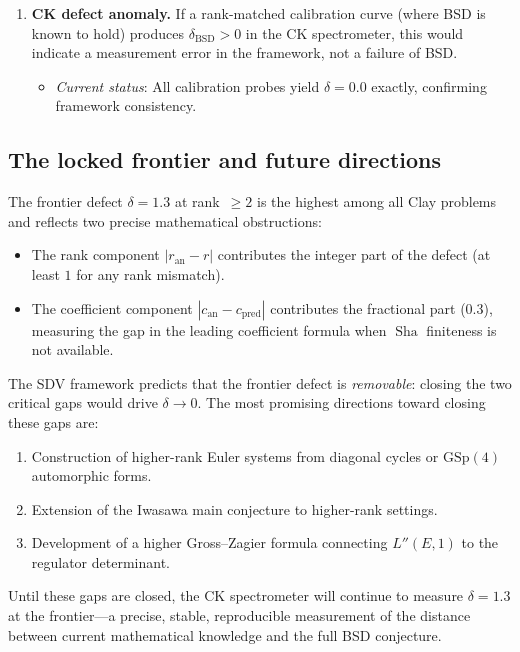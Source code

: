 \documentclass[11pt]{article}
\DeclareMathOperator{\Sha}{Sha}
\begin{document}
\begin{enumerate}
  \item \textbf{CK defect anomaly.}  If a rank-matched calibration curve
    (where BSD is known to hold) produces $\delta_{\mathrm{BSD}} > 0$ in the
    CK spectrometer, this would indicate a measurement error in the
    framework, not a failure of BSD.
    \begin{itemize}
      \item \emph{Current status}: All calibration probes yield
        $\delta = 0.0$ exactly, confirming framework consistency.
    \end{itemize}
\end{enumerate}

\subsection{The locked frontier and future directions}

The frontier defect $\delta = 1.3$ at rank~$\geq 2$ is the highest among all
Clay problems and reflects two precise mathematical obstructions:
\begin{itemize}
  \item The rank component $|r_{\mathrm{an}} - r|$ contributes the integer
    part of the defect (at least $1$ for any rank mismatch).
  \item The coefficient component $|c_{\mathrm{an}} - c_{\mathrm{pred}}|$
    contributes the fractional part ($0.3$), measuring the gap in the leading
    coefficient formula when $\Sha$ finiteness is not available.
\end{itemize}

The SDV framework predicts that the frontier defect is \emph{removable}:
closing the two critical gaps would drive $\delta \to 0$.  The most promising
directions toward closing these gaps are:
\begin{enumerate}
  \item Construction of higher-rank Euler systems from diagonal cycles or
    $\mathrm{GSp}(4)$ automorphic forms.
  \item Extension of the Iwasawa main conjecture to higher-rank settings.
  \item Development of a higher Gross--Zagier formula connecting $L''(E,1)$ to
    the regulator determinant.
\end{enumerate}

\noindent
Until these gaps are closed, the CK spectrometer will continue to measure
$\delta = 1.3$ at the frontier---a precise, stable, reproducible measurement
of the distance between current mathematical knowledge and the full BSD
conjecture.
\end{document}
